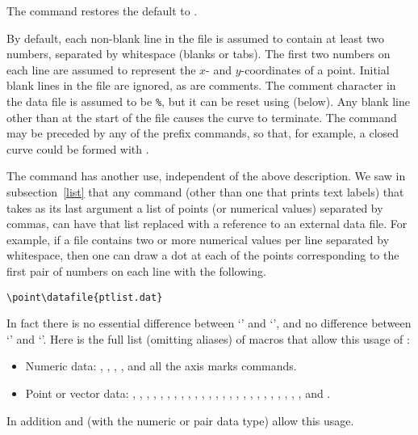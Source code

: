 \documentclass[letterpaper]{article}
\begin{document}
The command  restores the default  to
.

By default, each non-blank line in the file is assumed to contain at
least two numbers, separated by whitespace (blanks or tabs). The first
two numbers on each line are assumed to represent the $x$- and
$y$-coordinates of a point. Initial blank lines in the file are ignored,
as are comments. The comment character in the data file is assumed to be
\texttt{\%}, but it can be reset using  (below). Any
blank line other than at the start of the file causes the curve to
terminate. The  command may be preceded by any of the
prefix commands, so that, for example, a closed curve could be formed
with .

The  command has another use,
independent of the above description. We saw in subsection~\ref{list}
that any \mfp{} command (other than one that prints text labels) that
takes as its last argument a list of points (or numerical values)
separated by commas, can have that list replaced with a reference to an
external data file. For example, if a file  contains
two or more numerical values per line separated by whitespace, then one
can draw a dot at each of the points corresponding to the first pair of
numbers on each line with the following.
\begin{verbatim}
\point\datafile{ptlist.dat}
\end{verbatim}
In fact there is no essential difference between `'
and `', and no difference between
`' and `'.
Here is the full list (omitting aliases) of \mfp{} macros that allow
this usage of :

\begin{itemize}
\raggedright
\item Numeric data:
    , , ,
    , and all the axis marks commands.
\item Point or vector data:
    , , ,
    , , ,
    , , ,
    , , , ,
    , , ,
    , , , ,
    , , , ,
    , and .
\end{itemize}
In addition  and  (with the numeric or
pair data type) allow this usage.
\end{document}
